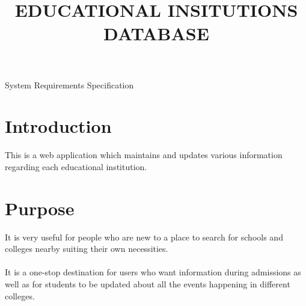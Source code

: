 \documentclass[11pt]{article}
\begin{document}
\title{ {\Huge \textbf{EDUCATIONAL INSITUTIONS DATABASE}}}
\maketitle
\begin{large}
\begin{Large}
{\LARGE System Requirements Specification}
\end{Large}
\end{large}
 
\section{Introduction}
{{\large This is a web application which maintains and updates various information regarding each educational institution.}}
\section{Purpose}
{\large
 It is very useful for people who are new to a place to search for schools and colleges nearby suiting their own necessities.}
 \\ \\{\large It is a one-stop destination for users who want information during admissions as well as for students to be updated about all the events happening in different colleges.}
\end{document}
